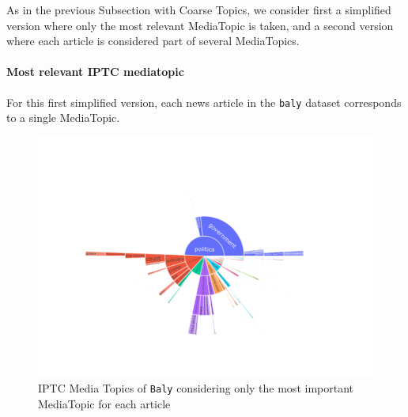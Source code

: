 






As in the previous Subsection with Coarse Topics, we consider first a simplified version where only the most relevant MediaTopic is taken, and a second version where each article is considered part of several MediaTopics.


\paragraph{Most relevant IPTC mediatopic}

For this first simplified version, each news article in the \texttt{baly} dataset corresponds to a single MediaTopic.

\begin{figure}[!htbp]
    \centering
    \includegraphics[trim={2.2cm 2cm 2.2cm 2cm},clip,width=\linewidth]{figures/baly_iptc_only_first.pdf}
    \caption{IPTC Media Topics of \texttt{Baly} considering only the most important MediaTopic for each article}
    \label{fig:baly_iptc_only_first}
\end{figure}

